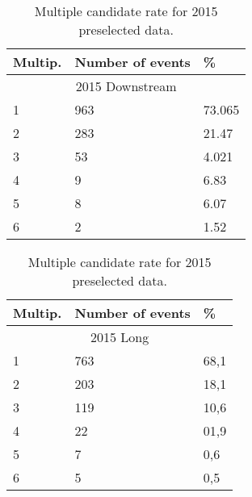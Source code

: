 \begin{table}[h!]
\begin{center}
\begin{tabular}{ p{2.1cm}p{3.1cm}p{0.9cm} }
\hline
\hline
Multip.  & Number of events & \% \\
\hline
    \multicolumn{3}{c}{2015 Downstream}\\
\hline
     1    & 963 & 73.065 \\
     2    & 283 & 21.47 \\
     3    & 53 & 4.021 \\
     4    & 9 &	6.83 \\
     5    & 8 &	6.07  \\
     6    & 2 & 1.52 \\

\hline
\end{tabular}
\quad
\begin{tabular}{ p{2.1cm}p{3.1cm}p{0.9cm} }
\hline
\hline
Multip.  & Number of events & \% \\
\hline
    \multicolumn{3}{c}{2015 Long}\\
\hline

     1    & 763	& 68,1  \\
     2    & 203	& 18,1 \\
     3    & 119	& 10,6 \\ 
     4    & 22	& 01,9 \\
     5    & 7	& 0,6 \\
     6    & 5	& 0,5 \\
    
\hline
\end{tabular}
\caption{Multiple candidate rate for 2015 preselected data.}
\label{tab:multi2015sel}
\end{center}
\end{table}%

